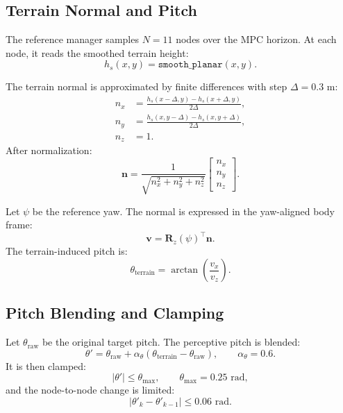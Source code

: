 \documentclass[11pt,a4paper]{article}
\begin{document}
\subsection{Terrain Normal and Pitch}

The reference manager samples $N=11$ nodes over the MPC horizon. At each node, it reads the smoothed terrain height:
\begin{equation}
	h_s(x,y)
	=
	\texttt{smooth\_planar}(x,y).
\end{equation}

The terrain normal is approximated by finite differences with step $\Delta=0.3$ m:
\begin{align}
	n_x &=
	\frac{h_s(x-\Delta,y)-h_s(x+\Delta,y)}{2\Delta},\\
	n_y &=
	\frac{h_s(x,y-\Delta)-h_s(x,y+\Delta)}{2\Delta},\\
	n_z &= 1.
\end{align}
After normalization:
\begin{equation}
	\bm{n}
	=
	\frac{1}{\sqrt{n_x^2+n_y^2+n_z^2}}
	\begin{bmatrix}
		n_x\\n_y\\n_z
	\end{bmatrix}.
\end{equation}

Let $\psi$ be the reference yaw. The normal is expressed in the yaw-aligned body frame:
\begin{equation}
	\bm{v}
	=
	\bm{R}_z(\psi)^{\top}\bm{n}.
\end{equation}
The terrain-induced pitch is:
\begin{equation}
	\theta_{\text{terrain}}
	=
	\arctan\left(\frac{v_x}{v_z}\right).
\end{equation}

\subsection{Pitch Blending and Clamping}

Let $\theta_{\text{raw}}$ be the original target pitch. The perceptive pitch is blended:
\begin{equation}
	\theta'
	=
	\theta_{\text{raw}}
	+
	\alpha_{\theta}
	(\theta_{\text{terrain}}-\theta_{\text{raw}}),
	\qquad
	\alpha_{\theta}=0.6.
\end{equation}
It is then clamped:
\begin{equation}
	|\theta'|\leq \theta_{\max},
	\qquad
	\theta_{\max}=0.25\text{ rad},
\end{equation}
and the node-to-node change is limited:
\begin{equation}
	|\theta'_k-\theta'_{k-1}|
	\leq
	0.06\text{ rad}.
\end{equation}
\end{document}
